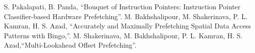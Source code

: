 \documentclass[conference]{IEEEtran}
\begin{document}
\begin{thebibliography}{00}
 S. Pakalapati, B. Panda, ``Bouquet of Instruction Pointers: Instruction Pointer Classifier-based Hardware Prefetching''.
 M. Bakhshalipour, M. Shakerinava, P. L. Kamran, H. S. Azad, ``Accurately and Maximally Prefetching Spatial Data Access Patterns with Bingo,''.
M. Shakerinava, M. Bakhshalipour, P. L. Kamran, H. S. Azad,``Multi-Lookahead Offset Prefetching''.
\end{thebibliography}
\vspace{12pt}
\end{document}
